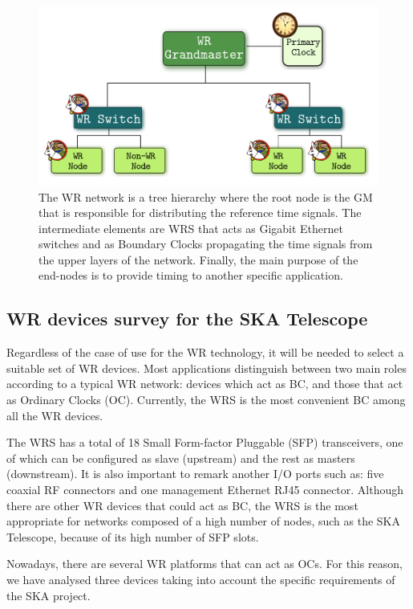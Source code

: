 \begin{figure}[H] \centering \includegraphics[scale=0.4]{img/wr_hierarchy}
	\caption{The WR network is a tree hierarchy where the root node is the
	GM that is responsible for distributing the reference time signals. The
	intermediate elements are WRS that acts as Gigabit Ethernet
	switches and as Boundary Clocks propagating the time signals from the
	upper layers of the network. Finally, the main purpose of the end-nodes
	is to provide timing to another specific application.}
\label{fig:wr_hierarchy} \end{figure}

\subsection{WR devices survey for the SKA Telescope} \label{subsec:wr-dev}

Regardless of the case of use for the WR technology, it will be needed to select
a suitable set of WR devices. Most applications distinguish between two main roles
according to a typical WR network: devices which act as BC, and those that act as
Ordinary Clocks (OC). Currently, the WRS \cite{ohwr:wrs} is the most convenient
BC among all the WR devices. 

The WRS has a total of 18 Small Form-factor Pluggable (SFP) transceivers, one of which can be configured as slave
(upstream) and the rest as masters (downstream). It is also important to remark
another I/O ports such as: five coaxial RF connectors and one management
Ethernet RJ45 connector. Although there are other WR devices that could act as
BC, the WRS is the most appropriate for networks composed of a high number of nodes,
such as the SKA Telescope, because of its high number of SFP slots.

Nowadays, there  are several WR platforms that can act as OCs. 
For this reason, we have analysed three devices taking into account the specific requirements of the SKA project.

